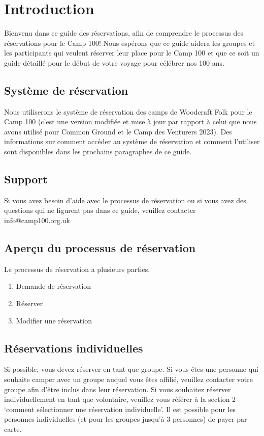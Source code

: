 \documentclass[a4paper, 11pt]{report}
\begin{document}
\makedocumenttitlepage

\tableofcontents

\chapter{Introduction}
Bienvenu dans ce guide des r\'eservations, afin de comprendre le processus des r\'eservations pour le Camp 100! Nous esp\'erons que ce guide aidera les groupes et les participants qui veulent r\'eserver leur place pour le Camp 100 et que ce soit un guide d\'etaill\'e pour le d\'ebut de votre voyage pour c\'el\'ebrer nos 100 ans.

\section{Syst\`eme de r\'eservation}
Nous utiliserons le syst\`eme de r\'eservation des camps de Woodcraft Folk pour le Camp 100 (c'est une version modifi\'ee et mise \`a jour par rapport \`a celui que nous avons utilis\'e pour Common Ground et le Camp des Venturers 2023). Des informations sur comment acc\'eder au syst\`eme de r\'eservation et comment l'utiliser sont disponibles dans les prochains paragraphes de ce guide.

\section{Support}
Si vous avez besoin d'aide avec le processus de r\'eservation ou si vous avez des questions qui ne figurent pas dans ce guide, veuillez contacter info@camp100.org.uk 

\section{Aperçu du processus de r\'eservation}
Le processus de r\'eservation a plusieurs parties.
\begin{enumerate}
    \item Demande de r\'eservation 
    \item R\'eserver 
    \item Modifier une r\'eservation 
\end{enumerate}

\section{R\'eservations individuelles}
Si possible, vous devez r\'eserver en tant que groupe. Si vous \^etes une personne qui souhaite camper avec un groupe auquel vous \^etes affili\'e, veuillez contacter votre groupe afin d'\^etre inclus dans leur r\'eservation. 
Si vous souhaitez r\'eserver individuellement en tant que volontaire, veuillez vous r\'ef\'erer \`a la section 2 `comment s\'electionner une r\'eservation individuelle'. Il est possible pour les personnes individuelles (et pour les groupes jusqu'\`a 3 personnes) de payer par carte.
\end{document}
